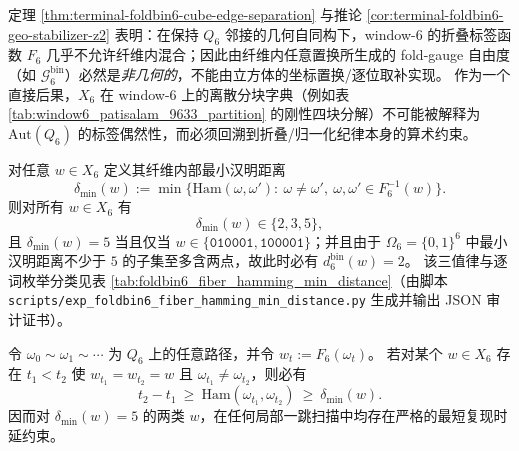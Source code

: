 \begin{enumerate}
  \begin{remark}\label{rem:terminal-foldbin6-geo-vs-gauge}
  定理 \ref{thm:terminal-foldbin6-cube-edge-separation} 与推论 \ref{cor:terminal-foldbin6-geo-stabilizer-z2} 表明：在保持 \(Q_6\) 邻接的几何自同构下，window-\(6\) 的折叠标签函数 \(F_6\) 几乎不允许纤维内混合；因此由纤维内任意置换所生成的 fold-gauge 自由度（如 \(\mathcal{G}^{\mathrm{bin}}_6\)）必然是\emph{非几何的}，不能由立方体的坐标置换/逐位取补实现。
  作为一个直接后果，\(X_6\) 在 window-\(6\) 上的离散分块字典（例如表 \ref{tab:window6_patisalam_9633_partition} 的刚性四块分解）不可能被解释为 \(\mathrm{Aut}(Q_6)\) 的标签偶然性，而必须回溯到折叠/归一化纪律本身的算术约束。
  \end{remark}

  \begin{theorem}\label{thm:terminal-foldbin6-fiber-hamming-three-valued}
  对任意 \(w\in X_6\) 定义其纤维内部最小汉明距离
  \[
  \delta_{\min}(w):=\min\bigl\{\mathrm{Ham}(\omega,\omega'):\ \omega\neq \omega',\ \omega,\omega'\in F_6^{-1}(w)\bigr\}.
  \]
  则对所有 \(w\in X_6\) 有
  \[
  \delta_{\min}(w)\in\{2,3,5\},
  \]
  且 \(\delta_{\min}(w)=5\) 当且仅当 \(w\in\{\texttt{010001},\texttt{100001}\}\)；并且由于 \(\Omega_6=\{0,1\}^6\) 中最小汉明距离不少于 \(5\) 的子集至多含两点，故此时必有 \(d^{\mathrm{bin}}_6(w)=2\)。
  该三值律与逐词枚举分类见表 \ref{tab:foldbin6_fiber_hamming_min_distance}（由脚本 \texttt{scripts/exp\_foldbin6\_fiber\_hamming\_min\_distance.py} 生成并输出 JSON 审计证书）。
  \end{theorem}
  

  \begin{corollary}[稳定类型的最短复现时延下界]\label{cor:terminal-foldbin6-min-return-delay}
  令 \(\omega_0\sim\omega_1\sim\cdots\) 为 \(Q_6\) 上的任意路径，并令 \(w_t:=F_6(\omega_t)\)。
  若对某个 \(w\in X_6\) 存在 \(t_1<t_2\) 使 \(w_{t_1}=w_{t_2}=w\) 且 \(\omega_{t_1}\neq \omega_{t_2}\)，则必有
  \[
  t_2-t_1\ \ge\ \mathrm{Ham}(\omega_{t_1},\omega_{t_2})\ \ge\ \delta_{\min}(w).
  \]
  因而对 \(\delta_{\min}(w)=5\) 的两类 \(w\)，在任何局部一跳扫描中均存在严格的最短复现时延约束。
  \end{corollary}


\end{enumerate}
